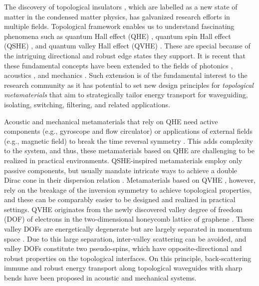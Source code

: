 \documentclass[aps,preprint,onecolumn,showpacs,superscriptaddress,groupedaddress]{revtex4}  %
\begin{document}

\keywords{}
\maketitle

The discovery of topological insulators \citep{1,2}, which are labelled as a new state of matter in the condensed matter physics, has galvanized research efforts in multiple fields. Topological framework enables us to understand fascinating phenomena such as quantum Hall effect (QHE) \citep{3,3a}, quantum spin Hall effect (QSHE) \citep{4}, and quantum valley Hall effect (QVHE) \citep{8}. These are special because of the intriguing directional and robust edge states they support. It is recent that these fundamental concepts have been extended to the fields of photonics \citep{14}, acoustics \citep{16,17,18,19,21,22,23}, and mechanics \citep{27,28,29,30,31,32,33,34,36,38,39,40}. Such extension is of the fundamental interest to the research community as it has potential to set new design principles for \textit{topological metamaterials} that aim to strategically tailor energy transport for waveguiding, isolating, switching, filtering, and related applications.

Acoustic and mechanical metamaterials that rely on QHE need active components (e.g., gyroscope and flow circulator) or applications of external fields (e.g., magnetic field) to break the time reversal symmetry \citep{16,17,18,28,29,30,31}. This adds complexity to the system, and thus, these metamaterials based on QHE are challenging to be realized in practical environments. QSHE-inspired metamaterials employ only passive components, but usually mandate intricate ways to achieve a double Dirac cone in their dispersion relation \citep{19,21,32,33,34,36}. Metamaterials based on QVHE \citep{22,23,38,39,40}, however, rely on the breakage of the inversion symmetry to achieve topological properties, and these can be comparably easier to be designed and realized in practical settings. QVHE originates from the newly discovered valley degree of freedom (DOF) of electrons in the two-dimensional honeycomb lattice of graphene \citep{8}. These valley DOFs are energetically degenerate but are largely separated in momentum space \citep{22,23}. Due to this large separation, inter-valley scattering can be avoided, and valley DOFs constitute two pseudo-spins, which have opposite-directional and robust properties on the topological interfaces. On this principle, back-scattering immune and robust energy transport along topological waveguides with sharp bends have been proposed in acoustic \citep{22,23} and mechanical \citep{39,40} systems.
\end{document}
